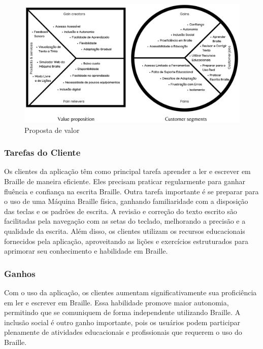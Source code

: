 \begin{figure}[h]
    \centering
    \includegraphics[scale=0.25]{ch03/assets/value-proposition.jpg}
    \decoRule
    \caption[Proposta de valor]{Proposta de valor}
    \label{fig:ch02-longitudinal-perspective}
\end{figure}

\subsubsection{Tarefas do Cliente}

Os clientes da aplicação têm como principal tarefa aprender a ler e escrever em Braille de maneira eficiente. Eles precisam praticar regularmente para ganhar fluência e confiança na escrita Braille. Outra tarefa importante é se preparar para o uso de uma Máquina Braille física, ganhando familiaridade com a disposição das teclas e os padrões de escrita. A revisão e correção do texto escrito são facilitadas pela navegação com as setas do teclado, melhorando a precisão e a qualidade da escrita. Além disso, os clientes utilizam os recursos educacionais fornecidos pela aplicação, aproveitando as lições e exercícios estruturados para aprimorar seu conhecimento e habilidade em Braille.

\subsubsection{Ganhos}

Com o uso da aplicação, os clientes aumentam significativamente sua proficiência em ler e escrever em Braille. Essa habilidade promove maior autonomia, permitindo que se comuniquem de forma independente utilizando Braille. A inclusão social é outro ganho importante, pois os usuários podem participar plenamente de atividades educacionais e profissionais que requerem o uso do Braille. 

